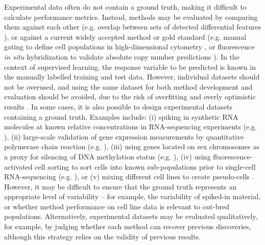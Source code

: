Experimental data often do not contain a ground truth, making it difficult to calculate performance metrics. Instead, methods may be evaluated by comparing them against each other (e.g. overlap between sets of detected differential features \cite{nowicka_drimseqdirichletmultinomialframework_2016}), or against a current widely accepted method or gold standard (e.g. manual gating to define cell populations in high-dimensional cytometry \cite{weber_comparisonclusteringmethods_2016, aghaeepour_criticalassessmentautomated_2013}, or fluorescence \textit{in situ} hybridization to validate absolute copy number predictions \cite{zheng_benchmarkingcontextsdetails_2017}). In the context of supervised learning, the response variable to be predicted is known in the manually labelled training and test data. However, individual datasets should not be overused, and using the same dataset for both method development and evaluation should be avoided, due to the risk of overfitting and overly optimistic results \cite{grimm_evaluationtoolsused_2015,jelizarow_overoptimismbioinformaticsillustration_2010}. In some cases, it is also possible to design experimental datasets containing a ground truth. Examples include: (i) spiking in synthetic RNA molecules at known relative concentrations \cite{jiang_syntheticspikeinstandards_2011} in RNA-sequencing experiments (e.g. \cite{seqc_comprehensiveassessmentrnaseq_2014,garalde_highlyparalleldirect_2018}), (ii) large-scale validation of gene expression measurements by quantitative polymerase chain reaction (e.g. \cite{seqc_comprehensiveassessmentrnaseq_2014}), (iii) using genes located on sex chromosomes as a proxy for silencing of DNA methylation status (e.g. \cite{law_voomprecisionweights_2014,fang_genomiclandscapehuman_2012}), (iv) using fluorescence-activated cell sorting to sort cells into known sub-populations prior to single-cell RNA-sequencing (e.g. \cite{soneson_biasrobustnessscalability_2018, schaum_singlecelltranscriptomics20_2018, zheng_massivelyparalleldigital_2017}), or (v) mixing different cell lines to create pseudo-cells \cite{tian_benchmarkingsinglecell_2019}. However, it may be difficult to ensure that the ground truth represents an appropriate level of variability -- for example, the variability of spiked-in material, or whether method performance on cell line data is relevant to out-bred populations. Alternatively, experimental datasets may be evaluated qualitatively, for example, by judging whether each method can recover previous discoveries, although this strategy relies on the validity of previous results.

